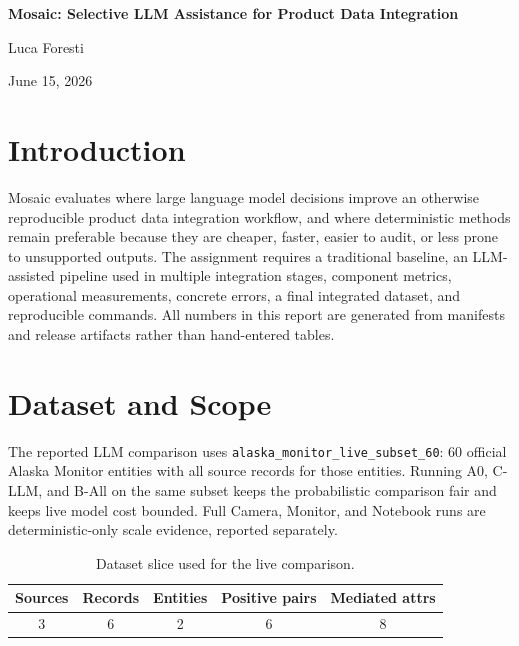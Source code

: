\documentclass[10pt]{article}
\newcommand{\tighttable}{\scriptsize\setlength{\tabcolsep}{3pt}\renewcommand{\arraystretch}{1.14}}
\begin{document}
\begin{titlepage}
\thispagestyle{empty}
\vspace*{\fill}
\begin{center}
{\sffamily\bfseries\fontsize{27}{33}\selectfont Mosaic: Selective LLM Assistance for Product Data Integration\par}
\vspace{0.55in}
{\Large Luca Foresti\par}
\vspace{0.18in}
{\large June 15, 2026\par}
\end{center}
\vspace*{\fill}
\end{titlepage}

\section{Introduction}
Mosaic evaluates where large language model decisions improve an otherwise
reproducible product data integration workflow, and where deterministic methods
remain preferable because they are cheaper, faster, easier to audit, or less
prone to unsupported outputs. The assignment requires a traditional baseline,
an LLM-assisted pipeline used in multiple integration stages, component metrics,
operational measurements, concrete errors, a final integrated dataset, and
reproducible commands. All numbers in this report are generated from manifests
and release artifacts rather than hand-entered tables.

\section{Dataset and Scope}
The reported LLM comparison uses \texttt{alaska\_monitor\_live\_subset\_60}:
60 official Alaska Monitor entities with all source records for those entities.
Running A0, C-LLM, and B-All on the same subset keeps the probabilistic
comparison fair and keeps live model cost bounded. Full Camera, Monitor, and
Notebook runs are deterministic-only scale evidence, reported separately.

\begin{table}[H]
\centering
\tighttable
\begin{tabularx}{\linewidth}{@{\extracolsep{\fill}}ccccc}
\toprule
Sources & Records & Entities & Positive pairs & Mediated attrs \\
\midrule
3 & 6 & 2 & 6 & 8 \\
\bottomrule
\end{tabularx}
\caption{Dataset slice used for the live comparison.}
\label{tab:dataset}
\end{table}
\end{document}
